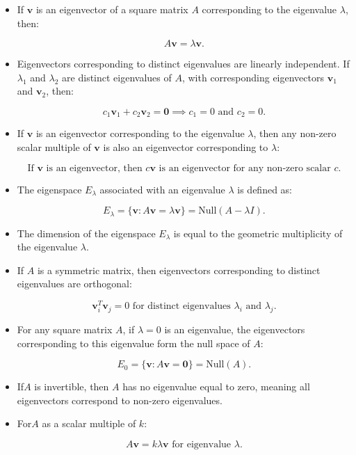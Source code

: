\documentclass[
  letterpaper,
  DIV=11,
  numbers=noendperiod]{scrreprt}
\theoremstyle{plain}
\theoremstyle{definition}
\theoremstyle{remark}
\begin{document}
\begin{tcolorbox}[enhanced jigsaw, leftrule=.75mm, bottomtitle=1mm, colback=white, toptitle=1mm, opacitybacktitle=0.6, toprule=.15mm, colbacktitle=quarto-callout-note-color!10!white, arc=.35mm, colframe=quarto-callout-note-color-frame, title=\textcolor{quarto-callout-note-color}{\faInfo}\hspace{0.5em}{Properties of Eigen vectors}, titlerule=0mm, rightrule=.15mm, left=2mm, bottomrule=.15mm, breakable, coltitle=black, opacityback=0]

\begin{itemize}
\item
  If \(\mathbf{v}\) is an eigenvector of a square matrix \(A\)
  corresponding to the eigenvalue \(\lambda\), then:

  \[
  A\mathbf{v} = \lambda \mathbf{v}.
  \]
\item
  Eigenvectors corresponding to distinct eigenvalues are linearly
  independent. If \(\lambda_1\) and \(\lambda_2\) are distinct
  eigenvalues of \(A\), with corresponding eigenvectors \(\mathbf{v}_1\)
  and \(\mathbf{v}_2\), then:

  \[
  c_1 \mathbf{v}_1 + c_2 \mathbf{v}_2 = \mathbf{0} \implies c_1 = 0 \text{ and } c_2 = 0.
  \]
\item
  If \(\mathbf{v}\) is an eigenvector corresponding to the eigenvalue
  \(\lambda\), then any non-zero scalar multiple of \(\mathbf{v}\) is
  also an eigenvector corresponding to \(\lambda\):

  \[
  \text{If } \mathbf{v} \text{ is an eigenvector, then } c\mathbf{v} \text{ is an eigenvector for any non-zero scalar } c.
  \]
\item
  The eigenspace \(E_{\lambda}\) associated with an eigenvalue
  \(\lambda\) is defined as:

  \[
  E_{\lambda} = \{ \mathbf{v} : A\mathbf{v} = \lambda \mathbf{v} \} = \text{Null}(A - \lambda I).
  \]
\item
  The dimension of the eigenspace \(E_{\lambda}\) is equal to the
  geometric multiplicity of the eigenvalue \(\lambda\).
\item
  If \(A\) is a symmetric matrix, then eigenvectors corresponding to
  distinct eigenvalues are orthogonal:

  \[
  \mathbf{v}_i^T \mathbf{v}_j = 0 \text{ for distinct eigenvalues } \lambda_i \text{ and } \lambda_j.
  \]
\item
  For any square matrix \(A\), if \(\lambda = 0\) is an eigenvalue, the
  eigenvectors corresponding to this eigenvalue form the null space of
  \(A\):

  \[
  E_{0} = \{ \mathbf{v} : A\mathbf{v} = \mathbf{0} \} = \text{Null}(A).
  \]
\item
  If\(A\) is invertible, then \(A\) has no eigenvalue equal to zero,
  meaning all eigenvectors correspond to non-zero eigenvalues.
\item
  For\(A\) as a scalar multiple of \(k\):

  \[
  A\mathbf{v} = k \lambda \mathbf{v} \text{ for eigenvalue } \lambda.
  \]
\end{itemize}

\end{tcolorbox}
\end{document}
